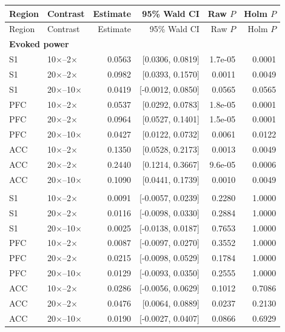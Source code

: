 \begin{longtable}{llrrrr}
\toprule
Region & Contrast & Estimate & 95\% Wald CI & Raw $P$ & Holm $P$ \\
\midrule
\endfirsthead
\toprule
Region & Contrast & Estimate & 95\% Wald CI & Raw $P$ & Holm $P$ \\
\midrule
\endhead
\multicolumn{6}{l}{\textbf{Evoked power}} \\
S1 & 10$\times$--2$\times$ & 0.0563 & [0.0306, 0.0819] & 1.7e-05 & 0.0001 \\
S1 & 20$\times$--2$\times$ & 0.0982 & [0.0393, 0.1570] & 0.0011 & 0.0049 \\
S1 & 20$\times$--10$\times$ & 0.0419 & [-0.0012, 0.0850] & 0.0565 & 0.0565 \\
PFC & 10$\times$--2$\times$ & 0.0537 & [0.0292, 0.0783] & 1.8e-05 & 0.0001 \\
PFC & 20$\times$--2$\times$ & 0.0964 & [0.0527, 0.1401] & 1.5e-05 & 0.0001 \\
PFC & 20$\times$--10$\times$ & 0.0427 & [0.0122, 0.0732] & 0.0061 & 0.0122 \\
ACC & 10$\times$--2$\times$ & 0.1350 & [0.0528, 0.2173] & 0.0013 & 0.0049 \\
ACC & 20$\times$--2$\times$ & 0.2440 & [0.1214, 0.3667] & 9.6e-05 & 0.0006 \\
ACC & 20$\times$--10$\times$ & 0.1090 & [0.0441, 0.1739] & 0.0010 & 0.0049 \\
\addlinespace
\multicolumn{6}{l}{\textbf{Induced power}} \\
S1 & 10$\times$--2$\times$ & 0.0091 & [-0.0057, 0.0239] & 0.2280 & 1.0000 \\
S1 & 20$\times$--2$\times$ & 0.0116 & [-0.0098, 0.0330] & 0.2884 & 1.0000 \\
S1 & 20$\times$--10$\times$ & 0.0025 & [-0.0138, 0.0187] & 0.7653 & 1.0000 \\
PFC & 10$\times$--2$\times$ & 0.0087 & [-0.0097, 0.0270] & 0.3552 & 1.0000 \\
PFC & 20$\times$--2$\times$ & 0.0215 & [-0.0098, 0.0529] & 0.1784 & 1.0000 \\
PFC & 20$\times$--10$\times$ & 0.0129 & [-0.0093, 0.0350] & 0.2555 & 1.0000 \\
ACC & 10$\times$--2$\times$ & 0.0286 & [-0.0056, 0.0629] & 0.1012 & 0.7086 \\
ACC & 20$\times$--2$\times$ & 0.0476 & [0.0064, 0.0889] & 0.0237 & 0.2130 \\
ACC & 20$\times$--10$\times$ & 0.0190 & [-0.0027, 0.0407] & 0.0866 & 0.6929 \\

\end{longtable}
